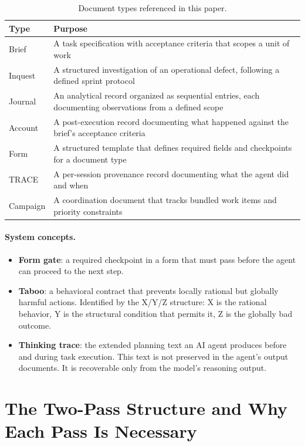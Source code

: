 \documentclass[11pt,a4paper]{article}
\begin{document}
\begin{table}[h]
\centering
\small
\caption{Document types referenced in this paper.}
\label{tab:doctypes}
\begin{tabular}{@{}lp{9.5cm}@{}}
\toprule
Type & Purpose \\
\midrule
Brief & A task specification with acceptance criteria that scopes a unit of work \\
Inquest & A structured investigation of an operational defect, following a defined sprint protocol \\
Journal & An analytical record organized as sequential entries, each documenting observations from a defined scope \\
Account & A post-execution record documenting what happened against the brief's acceptance criteria \\
Form & A structured template that defines required fields and checkpoints for a document type \\
TRACE & A per-session provenance record documenting what the agent did and when \\
Campaign & A coordination document that tracks bundled work items and priority constraints \\
\bottomrule
\end{tabular}
\end{table}

\paragraph{System concepts.}

\begin{itemize}
  \item \textbf{Form gate}: a required checkpoint in a form that must pass
    before the agent can proceed to the next step.
  \item \textbf{Taboo}: a behavioral contract that prevents locally rational
    but globally harmful actions. Identified by the X/Y/Z structure: X is the
    rational behavior, Y is the structural condition that permits it, Z is the
    globally bad outcome.
  \item \textbf{Thinking trace}: the extended planning text an AI agent
    produces before and during task execution. This text is not preserved in
    the agent's output documents. It is recoverable only from the model's
    reasoning output.
\end{itemize}

\section{The Two-Pass Structure and Why Each Pass Is Necessary}
\end{document}
